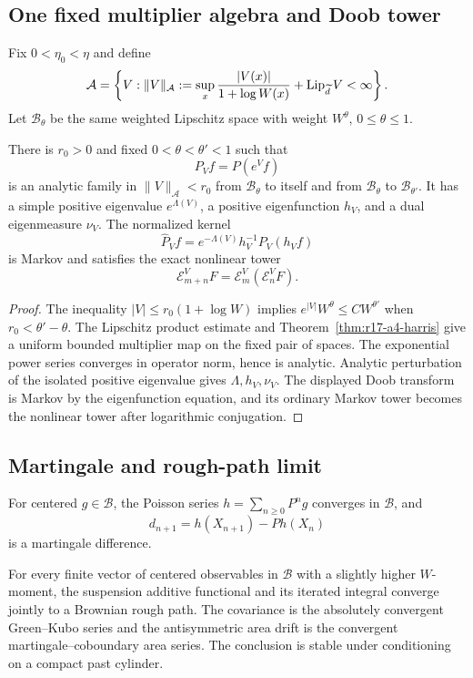 \subsection{One fixed multiplier algebra and Doob tower}

Fix \(0<\eta_0<\eta\) and define
\[
 \mathcal A=\left\{V:
  \|V\|_{\mathcal A}:=
  \sup_x{|V(x)|\over1+\log W(x)}
  +\operatorname{Lip}_{\widetilde d}V<\infty\right\}.
\]
Let \(\mathcal B_\theta\) be the same weighted Lipschitz space with weight
\(W^\theta\), \(0\le\theta\le1\).

\begin{theorem}
\label{thm:r17-a4-fk}
There is \(r_0>0\) and fixed \(0<\theta<\theta'<1\) such that
\[
 P_Vf=P(e^Vf)
\]
is an analytic family in \(\|V\|_{\mathcal A}<r_0\) from
\(\mathcal B_\theta\) to itself and from
\(\mathcal B_\theta\) to \(\mathcal B_{\theta'}\).  It has a simple positive
eigenvalue \(e^{\Lambda(V)}\), a positive eigenfunction \(h_V\), and a dual
eigenmeasure \(\nu_V\).  The normalized kernel
\[
 \widehat P_Vf=e^{-\Lambda(V)}h_V^{-1}P_V(h_Vf)
\]
is Markov and satisfies the exact nonlinear tower
\[
 \mathcal E_{m+n}^V F
 =\mathcal E_m^V(\mathcal E_n^VF).
\]
\end{theorem}

\begin{proof}
The inequality \(|V|\le r_0(1+\log W)\) implies
\(e^{|V|}W^\theta\le C W^{\theta'}\) when \(r_0<\theta'-\theta\).
The Lipschitz product estimate and
Theorem~\ref{thm:r17-a4-harris} give a uniform bounded multiplier map on the
fixed pair of spaces.  The exponential power series converges in operator
norm, hence is analytic.  Analytic perturbation of the isolated positive
eigenvalue gives \(\Lambda,h_V,\nu_V\).  The displayed Doob transform is
Markov by the eigenfunction equation, and its ordinary Markov tower becomes
the nonlinear tower after logarithmic conjugation.
\end{proof}

\subsection{Martingale and rough-path limit}

For centered \(g\in\mathcal B\), the Poisson series
\(h=\sum_{n\ge0}P^ng\) converges in \(\mathcal B\), and
\[
 d_{n+1}=h(X_{n+1})-Ph(X_n)
\]
is a martingale difference.

\begin{theorem}
\label{thm:r17-a4-rough}
For every finite vector of centered observables in \(\mathcal B\) with a
slightly higher \(W\)-moment, the suspension additive functional and its
iterated integral converge jointly to a Brownian rough path.  The covariance
is the absolutely convergent Green--Kubo series and the antisymmetric area
drift is the convergent martingale--coboundary area series.  The conclusion is
stable under conditioning on a compact past cylinder.
\end{theorem}


